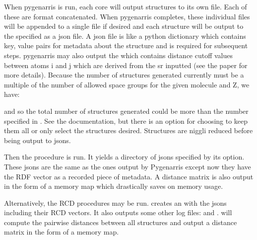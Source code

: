 \documentclass[letterpaper,10pt,english]{sphinxmanual}
\begin{document}
When pygenarris is run, each core will output structures to its own
 file. Each of these are  format concatenated.
When pygenarris completes, these individual files will be appended to a
single  file if desired and each structure will be
output to the  specified as a json file. A json file is like a
python dictionary which contains key, value pairs for metadata
about the structure and is required for subsequent steps. pygenarris may also
output the  which contains distance cutoff
values between atoms i and j which are derived from the sr inputted
(see the paper for more details). Because the number of structures generated
currently must be a multiple of the number of allowed space groups for the
given molecule and Z, we have:

\begin{sphinxVerbatim}[commandchars=\\\{\}]
 
                 
                  
\end{sphinxVerbatim}

and so the total number of structures generated could
be more than the number specified in . See the documentation, but
there is an option for choosing to keep them all or only select
the  structures desired. Structures are niggli reduced
before being output to jsons.

Then the  procedure is run. It yields a directory of jsons
specified by its  option. These jsons are the same as the
ones output by Pygenarris except now they have the RDF vector as a recorded
piece of metadata. A distance matrix is also output in the form
of a memory map which drastically saves on memory usage.

Alternatively, the RCD procedures may be run.  creates an
 with the jsons including their RCD vectors. It also
outputs some other log files:  and .
 will compute the pairwise distances between all
structures and output a distance matrix in the form of a memory map.
\end{document}
